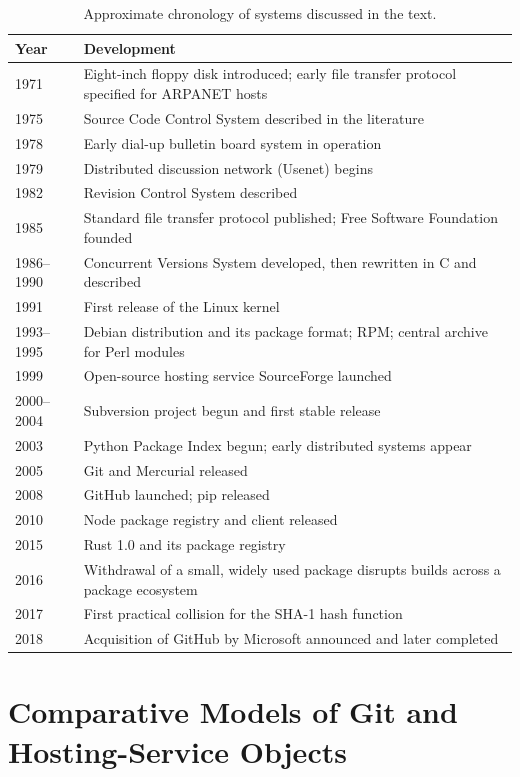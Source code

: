 \documentclass[11pt,twoside,openright]{book}
\theoremstyle{plain}
\theoremstyle{definition}
\theoremstyle{remark}
\begin{document}
\begin{table}[h]
\centering
\caption{Approximate chronology of systems discussed in the text.}
\label{tab:chron}
\small
\begin{tabular}{lp{}}
\toprule
Year & Development \\
\midrule
1971 & Eight-inch floppy disk introduced; early file transfer protocol specified for ARPANET hosts \\
1975 & Source Code Control System described in the literature \\
1978 & Early dial-up bulletin board system in operation \\
1979 & Distributed discussion network (Usenet) begins \\
1982 & Revision Control System described \\
1985 & Standard file transfer protocol published; Free Software Foundation founded \\
1986--1990 & Concurrent Versions System developed, then rewritten in C and described \\
1991 & First release of the Linux kernel \\
1993--1995 & Debian distribution and its package format; RPM; central archive for Perl modules \\
1999 & Open-source hosting service SourceForge launched \\
2000--2004 & Subversion project begun and first stable release \\
2003 & Python Package Index begun; early distributed systems appear \\
2005 & Git and Mercurial released \\
2008 & GitHub launched; pip released \\
2010 & Node package registry and client released \\
2015 & Rust 1.0 and its package registry \\
2016 & Withdrawal of a small, widely used package disrupts builds across a package ecosystem \\
2017 & First practical collision for the SHA-1 hash function \\
2018 & Acquisition of GitHub by Microsoft announced and later completed \\
\bottomrule
\end{tabular}
\end{table}

\chapter{Comparative Models of Git and Hosting-Service Objects}\label{app:objects}
\end{document}
